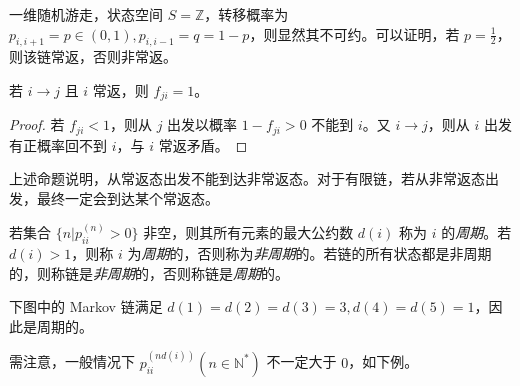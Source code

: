 \documentclass[../main.tex]{subfiles}
\begin{document}
\begin{example}
    一维随机游走，状态空间 $S=\mathbb Z$，转移概率为 $p_{i,i+1}=p\in(0,1),p_{i,i-1}=q=1-p$，则显然其不可约。可以证明，若 $p=\frac12$，则该链常返，否则非常返。
\end{example}

\begin{proposition}
    若 $i\rightarrow j$ 且 $i$ 常返，则 $f_{ji}=1$。
\end{proposition}

\begin{proof}
    若 $f_{ji}<1$，则从 $j$ 出发以概率 $1-f_{ji}>0$ 不能到 $i$。又 $i\rightarrow j$，则从 $i$ 出发有正概率回不到 $i$，与 $i$ 常返矛盾。
\end{proof}

上述命题说明，从常返态出发不能到达非常返态。对于有限链，若从非常返态出发，最终一定会到达某个常返态。

\begin{definition}\label{def:7.3.5}
    若集合 $\{n|p_{ii}^{(n)}>0\}$ 非空，则其所有元素的最大公约数 $d(i)$ 称为 $i$ 的\emph{周期}。若 $d(i)>1$，则称 $i$ 为\emph{周期}的，否则称为\emph{非周期}的。若链的所有状态都是非周期的，则称链是\emph{非周期}的，否则称链是\emph{周期}的。
\end{definition}

\begin{example}
    下图中的 Markov 链满足 $d(1)=d(2)=d(3)=3,d(4)=d(5)=1$，因此是周期的。
    \begin{center}
    \end{center}
    \bigskip
\end{example}

需注意，一般情况下 $p_{ii}^{(nd(i))}(n\in\mathbb N^*)$ 不一定大于 $0$，如下例。
\end{document}
